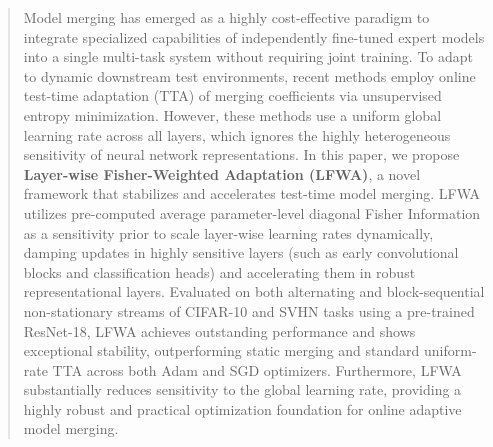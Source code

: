 \documentclass{article}
\theoremstyle{plain}
\theoremstyle{definition}
\theoremstyle{remark}
\begin{document}
\setlength{\abovedisplayskip}{4pt}
\setlength{\belowdisplayskip}{4pt}
\setlength{\abovedisplayshortskip}{4pt}
\setlength{\belowdisplayshortskip}{4pt}


\printAffiliationsAndNotice{}

\makeatletter
\gdef\@icmltitlerunning{LFWA: Layer-wise Fisher-Weighted Test-Time Model Merging}
\makeatother

\begin{abstract}
  Model merging has emerged as a highly cost-effective paradigm to integrate specialized capabilities of independently fine-tuned expert models into a single multi-task system without requiring joint training. To adapt to dynamic downstream test environments, recent methods employ online test-time adaptation (TTA) of merging coefficients via unsupervised entropy minimization. However, these methods use a uniform global learning rate across all layers, which ignores the highly heterogeneous sensitivity of neural network representations. In this paper, we propose \textbf{Layer-wise Fisher-Weighted Adaptation (LFWA)}, a novel framework that stabilizes and accelerates test-time model merging. LFWA utilizes pre-computed average parameter-level diagonal Fisher Information as a sensitivity prior to scale layer-wise learning rates dynamically, damping updates in highly sensitive layers (such as early convolutional blocks and classification heads) and accelerating them in robust representational layers. Evaluated on both alternating and block-sequential non-stationary streams of CIFAR-10 and SVHN tasks using a pre-trained ResNet-18, LFWA achieves outstanding performance and shows exceptional stability, outperforming static merging and standard uniform-rate TTA across both Adam and SGD optimizers. Furthermore, LFWA substantially reduces sensitivity to the global learning rate, providing a highly robust and practical optimization foundation for online adaptive model merging.
\end{abstract}
\end{document}
